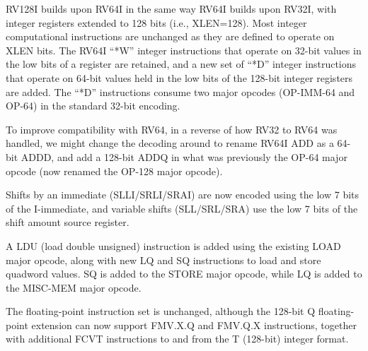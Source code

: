 RV128I builds upon RV64I in the same way RV64I builds upon RV32I, with
integer registers extended to 128 bits (i.e., XLEN=128).  Most integer
computational instructions are unchanged as they are defined to
operate on XLEN bits.  The RV64I ``*W'' integer instructions that
operate on 32-bit values in the low bits of a register are retained,
and a new set of ``*D'' integer instructions that operate on 64-bit
values held in the low bits of the 128-bit integer registers are
added.  The ``*D'' instructions consume two major opcodes (OP-IMM-64
and OP-64) in the standard 32-bit encoding.

\begin{commentary}
  To improve compatibility with RV64, in a reverse of how RV32 to RV64
  was handled, we might change the decoding around to rename RV64I ADD
  as a 64-bit ADDD, and add a 128-bit ADDQ in what was previously the
  OP-64 major opcode (now renamed the OP-128 major opcode).
\end{commentary}

Shifts by an immediate (SLLI/SRLI/SRAI) are now encoded using the low
7 bits of the I-immediate, and variable shifts (SLL/SRL/SRA) use the
low 7 bits of the shift amount source register.

A LDU (load double unsigned) instruction is added using the existing
LOAD major opcode, along with new LQ and SQ instructions to load and
store quadword values.  SQ is added to the STORE major opcode, while
LQ is added to the MISC-MEM major opcode.

The floating-point instruction set is unchanged, although the 128-bit
Q floating-point extension can now support FMV.X.Q and FMV.Q.X
instructions, together with additional FCVT instructions to and from
the T (128-bit) integer format.


